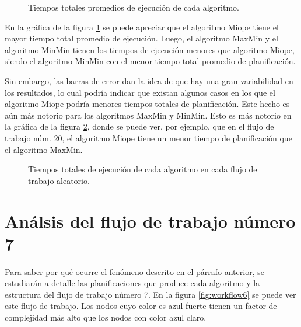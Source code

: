 \begin{figure}
\begin{center}
\end{center}
\label{fig:tiempos_promedios}
\caption{Tiempos totales promedios de ejecución de cada algoritmo.}
\end{figure}

En la gráfica de la figura \ref{fig:tiempos_promedios} se puede apreciar que el algoritmo Miope tiene el mayor tiempo total promedio de ejecución. Luego, el algoritmo MaxMin y el algoritmo MinMin tienen los tiempos de ejecución menores que algoritmo Miope, siendo el algoritmo MinMin con el menor tiempo total promedio de planificación.

Sin embargo, las barras de error dan la idea de que hay una gran variabilidad en los resultados, lo cual podría indicar que existan algunos casos en los que el algoritmo Miope podría menores tiempos totales de planificación. Este hecho es aún más notorio para los algoritmos MaxMin y MinMin. Esto es más notorio en la gráfica de la figura \ref{fig:tiempos_totales}, donde se puede ver, por ejemplo, que en el flujo de trabajo núm. 20, el algoritmo Miope tiene un menor tiempo de planificación que el algoritmo MaxMin.

\begin{figure}
\begin{center}
\end{center}
\label{fig:tiempos_totales}
\caption{Tiempos totales de ejecución de cada algoritmo en cada flujo de trabajo aleatorio.}
\end{figure}

\section{Análsis del flujo de trabajo número 7}
Para saber por qué ocurre el fenómeno descrito en el párrafo anterior, se estudiarán a detalle las planificaciones que produce cada algoritmo y la estructura del flujo de trabajo número 7. En la figura \ref{fig:workflow6} se puede ver este flujo de trabajo. Los nodos cuyo color es azul fuerte tienen un factor de complejidad más alto que los nodos con color azul claro.

